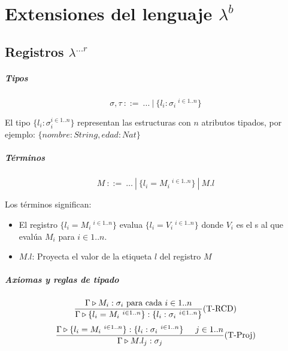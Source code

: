 \chapter{Extensiones del lenguaje \texorpdfstring{$\lambda^b$}{lambda b}}



\section{Registros \texorpdfstring{$\lambda^{...r}$}{lambda ...r}}

\paragraph{Tipos}
$$\sigma, \tau ~::=~...~|~\{l_i : \sigma_i ~^{i\in 1..n}\}$$

El tipo $\{l_i : \sigma_i^{i\in 1..n}\}$ representan las estructuras con $n$ atributos tipados, por ejemplo: $\{nombre : String,edad:Nat\}$
\paragraph{Términos}
$$ M~::=~ \dots~|~\{l_i = M_i ~^{i\in 1..n}\}~|~M.l $$

Los términos significan:
\begin{itemize}
    \item El registro $\{l_i = M_i ~^{i\in 1..n}\}$ evalua $\{l_i = V_i ~^{i\in 1..n}\}$  donde $V_i$ es el s al que evalúa $M_i$ para $i\in 1..n$.
    \item $M.l$: Proyecta el valor de la etiqueta $l$ del registro $M$
\end{itemize}

\paragraph{Axiomas y reglas de tipado}
\begin{equation*}
\frac{\Gamma\triangleright M_i : \sigma_i \text{ para cada } i \in 1..n}{\Gamma\triangleright \{l_i = M_i ~^{i\in 1..n}\} : \{l_i : \sigma_i ~^{i\in 1..n}\}}(\text{T-RCD})
\end{equation*}
\vspace*{5mm}
\begin{equation*}
\frac{\Gamma\triangleright \{l_i = M_i ~^{i\in 1..n}\} : \{l_i : \sigma_i ~^{i\in 1..n}\}\hspace*{5mm} j \in 1..n}
{\Gamma\triangleright M.l_j : \sigma_j}(\text{T-Proj})
\end{equation*}

